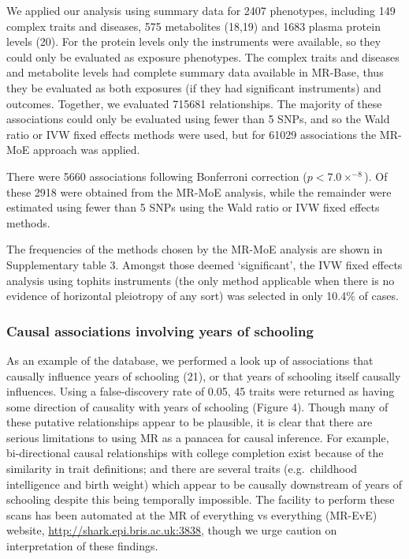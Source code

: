 \documentclass[]{article}
\begin{document}
We applied our analysis using summary data for 2407 phenotypes,
including 149 complex traits and diseases, 575 metabolites (18,19) and
1683 plasma protein levels (20). For the protein levels only the
instruments were available, so they could only be evaluated as exposure
phenotypes. The complex traits and diseases and metabolite levels had
complete summary data available in MR-Base, thus they be evaluated as
both exposures (if they had significant instruments) and outcomes.
Together, we evaluated 715681 relationships. The majority of these
associations could only be evaluated using fewer than 5 SNPs, and so the
Wald ratio or IVW fixed effects methods were used, but for 61029
associations the MR-MoE approach was applied.

There were 5660 associations following Bonferroni correction
(\(p < 7.0\times^{-8}\)). Of these 2918 were obtained from the MR-MoE
analysis, while the remainder were estimated using fewer than 5 SNPs
using the Wald ratio or IVW fixed effects methods.

The frequencies of the methods chosen by the MR-MoE analysis are shown
in Supplementary table 3. Amongst those deemed `significant', the IVW
fixed effects analysis using tophits instruments (the only method
applicable when there is no evidence of horizontal pleiotropy of any
sort) was selected in only 10.4\% of cases.

\subsubsection{Causal associations involving years of
schooling}\label{causal-associations-involving-years-of-schooling}

As an example of the database, we performed a look up of associations
that causally influence years of schooling (21), or that years of
schooling itself causally influences. Using a false-discovery rate of
0.05, 45 traits were returned as having some direction of causality with
years of schooling (Figure 4). Though many of these putative
relationships appear to be plausible, it is clear that there are serious
limitations to using MR as a panacea for causal inference. For example,
bi-directional causal relationships with college completion exist
because of the similarity in trait definitions; and there are several
traits (e.g.~childhood intelligence and birth weight) which appear to be
causally downstream of years of schooling despite this being temporally
impossible. The facility to perform these scans has been automated at
the MR of everything vs everything (MR-EvE) website,
\url{http://shark.epi.bris.ac.uk:3838}, though we urge caution on
interpretation of these findings.
\end{document}
